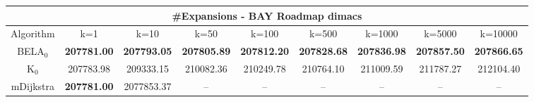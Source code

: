 \begin{tabular}{c|cccccccc}\toprule
\multicolumn{9}{c}{#Expansions - BAY Roadmap dimacs}\\ \midrule
Algorithm & k=1 & k=10 & k=50 & k=100 & k=500 & k=1000 & k=5000 & k=10000 \\ \midrule
BELA$_0$ & \textbf{207781.00} & \textbf{207793.05} & \textbf{207805.89} & \textbf{207812.20} & \textbf{207828.68} & \textbf{207836.98} & \textbf{207857.50} & \textbf{207866.65} \\
K$_0$ & 207783.98 & 209333.15 & 210082.36 & 210249.78 & 210764.10 & 211009.59 & 211787.27 & 212104.40 \\
mDijkstra & \textbf{207781.00} & 2077853.37 & -- & -- & -- & -- & -- & -- \\ \bottomrule 
\end{tabular}
